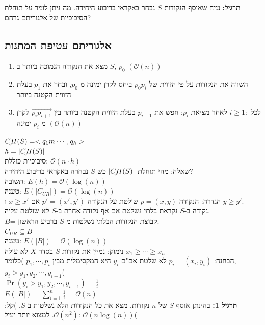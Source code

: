 \documentclass{article}
\makeatletter
\newcommand{\uhat}{\underaccent{\check}}
\newcommand*{\saved@uline}{}
\let\saved@uline\uline
\newcommand*{\mathuline}{%
  \mathpalette{\math@uline\saved@uline}%
}
\newcommand*{\math@uline}[3]{%
  \mbox{#1{$#2#3\m@th$}}%
}
\renewcommand*{\uline}{%
  \relax  
  \ifmmode
    \expandafter\mathuline
  \else
    \expandafter\saved@uline
  \fi
}
\makeatother
\begin{document}
\noindent\textbf{תרגיל:} נניח שאוסף הנקודות $S$ נבחר באקראי בריבוע היחידה. מה ניתן לומר על תוחלת הסיבוכיות של אלגוריתם גרהם?


\subsection{אלגוריתם עטיפת המתנות}
\begin{enumerate}
\item מצא את הנקודה הנמוכה ביותר ב-$S$, $p_0$ $(\mathcal{O}(n))$
\item השווה את הנקודות על פי הזווית של $p_0 p_i$ ביחס לקרן ימינה מ-$p_0$, ובחר את $p_1$ בעלת הזווית הקטנה ביותר
\item לכל $i \geq 1:$ לאחר מציאת $p_i$: חפש את $p_{i+1}$ בעלת הזווית הקטנה ביותר בין $\overrightarrow{p_i p_{i+1}}$ לקרן מ-$p_i$ ימינה $(\mathcal{O}(n))$
\end{enumerate}
$\uhat{CH}(S)= <q_1m \cdots, q_h>$\\
$h=|\uhat{CH}(S)|$\\
סיבוכיות כוללת: $\mathcal{O}(n \cdot h)$\\
\uline{שאלה:} מהי תוחלת $|\uhat{CH}(S)|$ כש-$S$ נבחרה באקראי בריבוע היחידה?\\
\uline{תשובה:} $E(h)= \mathcal{O}(\log(n))$\\
\uline{טענה:} $E(|C_{UR}|)= \mathcal{O}(\log(n))$\\
\uline{הגדרה:} הנקודה $p=(x,y)$ שולטת על הנקודה $p'=(x',y')$ אם $x \geq x'$ ו-$y \geq y'$.\\
נקודה ב-$S$ נקראת בלתי נשלטת אם אף נקודה אחרת ב-$S$ לא שולטת עליה.\\
$B$= קבוצת הנקודות הבלתי-נשלטות מ-$S$ ברביע הראשון.\\
$C_{UR} \subseteq B$\\
\uline{טענה:} $E(|B|)= \mathcal{O}(\log(n))$\\
\uline{נימוק:} נמיין את נקודות $S$ בסדר $X$ לא עולה $x_1 \geq \cdots \geq x_n$\\
\uline{הבחנה:}
$p_i=(x_i, y_i)$ לא שלטת אם"ם $y_i$ היא המקסימלית מבין $p_1, \cdots, p_i$ )כלומר, $y_i>y_1, y_2, \cdots, y_{i-1}$(\\
$\Pr(y_i>y_1, y_2, \cdots, y_{i-1})= \frac{1}{i}$\\
$E(|B|)= \sum_{i=1}^n \frac{1}{i}= \mathcal{O}(n)$\\
\textbf{תרגיל 1:} בהינתן אוסף $S$ של $n$ נקודות, מצא את כל הנקודות הלא נשלטות ב-$S$. )קל: $\mathcal{O}(n^2)$. למצוא יותר יעיל: $\mathcal{O}(n \log(n))$(\\
\end{document}
